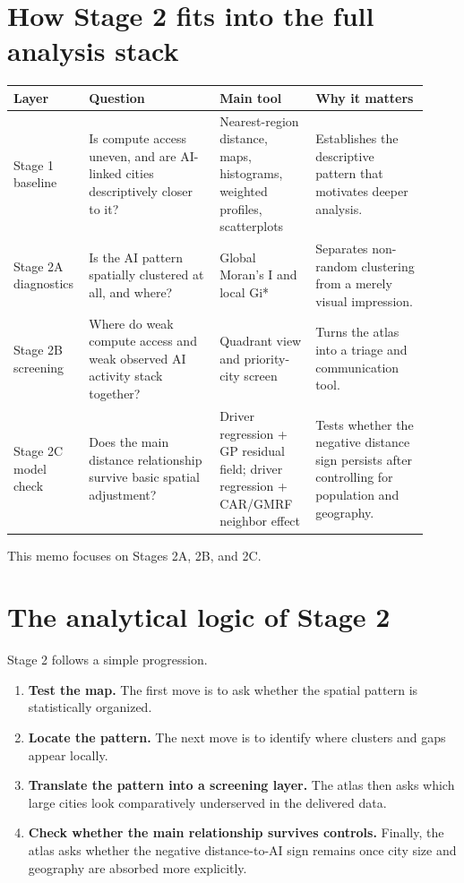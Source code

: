 \documentclass[11pt]{article}
\begin{document}
\section{How Stage 2 fits into the full analysis stack}
\begin{longtable}{>{\raggedright\arraybackslash}p{0.14\linewidth} >{\raggedright\arraybackslash}p{0.30\linewidth} >{\raggedright\arraybackslash}p{0.22\linewidth} >{\raggedright\arraybackslash}p{0.26\linewidth}}
\toprule
\textbf{Layer} & \textbf{Question} & \textbf{Main tool} & \textbf{Why it matters} \\
\midrule
Stage 1 baseline & Is compute access uneven, and are AI-linked cities descriptively closer to it? & Nearest-region distance, maps, histograms, weighted profiles, scatterplots & Establishes the descriptive pattern that motivates deeper analysis. \\
Stage 2A diagnostics & Is the AI pattern spatially clustered at all, and where? & Global Moran's I and local Gi* & Separates non-random clustering from a merely visual impression. \\
Stage 2B screening & Where do weak compute access and weak observed AI activity stack together? & Quadrant view and priority-city screen & Turns the atlas into a triage and communication tool. \\
Stage 2C model check & Does the main distance relationship survive basic spatial adjustment? & Driver regression + GP residual field; driver regression + CAR/GMRF neighbor effect & Tests whether the negative distance sign persists after controlling for population and geography. \\
\bottomrule
\end{longtable}

This memo focuses on Stages 2A, 2B, and 2C.

\section{The analytical logic of Stage 2}
Stage 2 follows a simple progression.
\begin{enumerate}[leftmargin=*]
    \item \textbf{Test the map.} The first move is to ask whether the spatial pattern is statistically organized.
    \item \textbf{Locate the pattern.} The next move is to identify where clusters and gaps appear locally.
    \item \textbf{Translate the pattern into a screening layer.} The atlas then asks which large cities look comparatively underserved in the delivered data.
    \item \textbf{Check whether the main relationship survives controls.} Finally, the atlas asks whether the negative distance-to-AI sign remains once city size and geography are absorbed more explicitly.
\end{enumerate}
\end{document}
